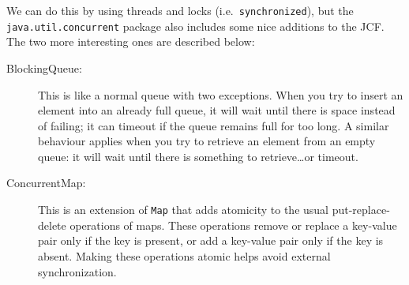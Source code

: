 We can do this by using threads and locks (i.e.~\verb+synchronized+),
but the \verb+java.util.concurrent+ package also includes some nice
additions to the JCF. The two more interesting ones are described
below: 

\begin{description}
\item[BlockingQueue: ] This is like a normal queue with two
  exceptions. When you try to insert an element into an already full
  queue, it will wait until there is space instead of failing; it can
  timeout if the queue remains full for too long. A similar behaviour
  applies when you try to retrieve an element from an empty queue: it
  will wait until there is something to retrieve\ldots or timeout.
\item[ConcurrentMap: ] This is an extension of \verb+Map+ that adds
  atomicity to the usual put-replace-delete operations of maps. These
  operations remove or replace a key-value pair only if the key is
  present, or add a key-value pair only if the key is absent. Making
  these operations atomic helps avoid external synchronization.
\end{description}



